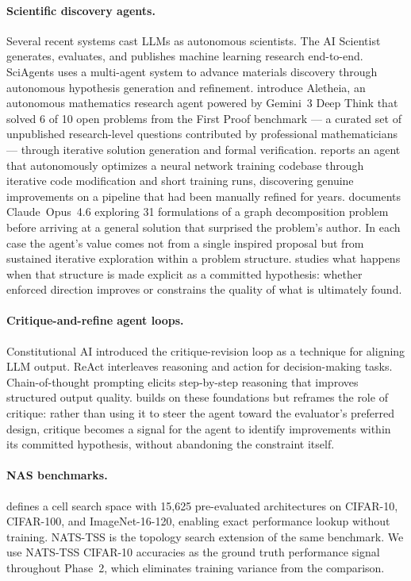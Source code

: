 \paragraph{Scientific discovery agents.}
Several recent systems cast LLMs as autonomous scientists. The AI Scientist
\citep{lu2024aiscientist} generates, evaluates, and publishes machine learning
research end-to-end. SciAgents \citep{ghafarollahi2024sciagents} uses a
multi-agent system to advance materials discovery through autonomous hypothesis
generation and refinement. \citet{feng2026aletheia} introduce Aletheia, an
autonomous mathematics research agent powered by Gemini~3 Deep Think that
solved 6 of 10 open problems from the First Proof benchmark
\citep{firstproof2026} --- a curated set of unpublished research-level
questions contributed by professional mathematicians --- through iterative
solution generation and formal verification. \citet{karpathy2026autoresearch}
reports an agent that autonomously optimizes a neural network training codebase
through iterative code modification and short training runs, discovering
genuine improvements on a pipeline that had been manually refined for years.
\citet{knuth2026claude} documents Claude~Opus~4.6 exploring 31 formulations
of a graph decomposition problem before arriving at a general solution that
surprised the problem's author. In each case the agent's value comes not from
a single inspired proposal but from sustained iterative exploration within a
problem structure. \haas{} studies what happens when that structure is made
explicit as a committed hypothesis: whether enforced direction improves or
constrains the quality of what is ultimately found.

\paragraph{Critique-and-refine agent loops.}
Constitutional AI \citep{bai2022constitutional} introduced the
critique-revision loop as a technique for aligning LLM output. ReAct
\citep{yao2023react} interleaves reasoning and action for decision-making tasks.
Chain-of-thought prompting \citep{wei2022chain} elicits step-by-step reasoning
that improves structured output quality. \haas{} builds on these foundations
but reframes the role of critique: rather than using it to steer the agent toward
the evaluator's preferred design, critique becomes a signal for the agent to
identify improvements within its committed hypothesis, without abandoning the
constraint itself.

\paragraph{NAS benchmarks.}
\nasbench{} \citep{dong2020nasbench201} defines a cell search space with 15,625
pre-evaluated architectures on CIFAR-10, CIFAR-100, and ImageNet-16-120, enabling
exact performance lookup without training. NATS-TSS \citep{dong2021nats} is the
topology search extension of the same benchmark. We use NATS-TSS CIFAR-10
accuracies as the ground truth performance signal throughout Phase~2, which
eliminates training variance from the comparison.

